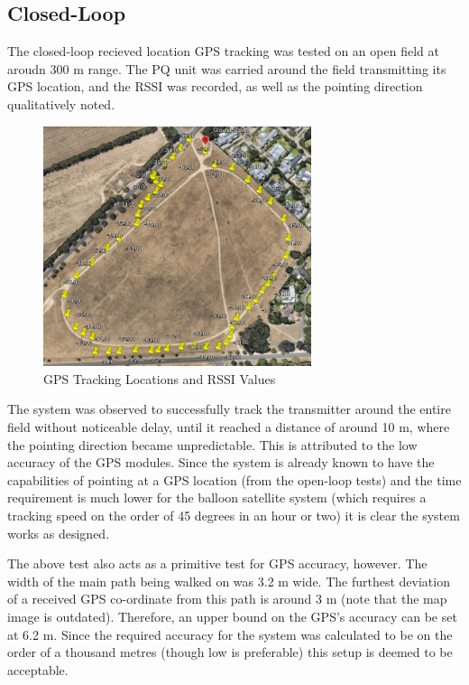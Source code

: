 \subsection{Closed-Loop}

The closed-loop recieved location GPS tracking was tested on an open field at aroudn 300 m range. The PQ unit was carried around the field transmitting its GPS location, and the RSSI was recorded, as well as the pointing direction qualitatively noted.

\begin{figure}[!htb]
  \centering
  \includegraphics[width=0.7\textwidth]{gpsTrackingMap}
  \caption{GPS Tracking Locations and RSSI Values}
  \label{fig:gpsTrackingMap}
\end{figure}

The system was observed to successfully track the transmitter around the entire field without noticeable delay, until it reached a distance of around 10 m, where the pointing direction became unpredictable. This is attributed to the low accuracy of the GPS modules. Since the system is already known to have the capabilities of pointing at a GPS location (from the open-loop tests) and the time requirement is much lower for the balloon satellite system (which requires a tracking speed on the order of 45 degrees in an hour or two) it is clear the system works as designed.

The above test also acts as a primitive test for GPS accuracy, however. The width of the main path being walked on was 3.2 m wide. The furthest deviation of a received GPS co-ordinate from this path is around 3 m (note that the map image is outdated). Therefore, an upper bound on the GPS's accuracy can be set at 6.2 m. Since the required accuracy for the system was calculated to be on the order of a thousand metres (though low is preferable) this setup is deemed to be acceptable.